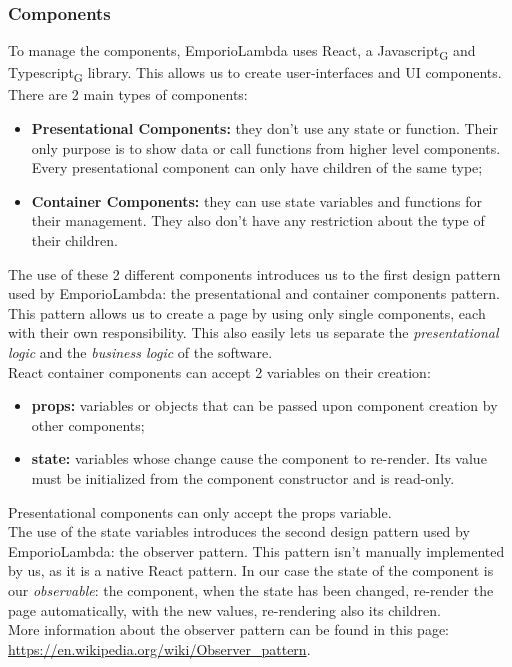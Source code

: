 \subsubsection{Components}
To manage the components, EmporioLambda uses React, a Javascript\textsubscript{G} and Typescript\textsubscript{G} library. This allows us to create user-interfaces and UI components.
There are 2 main types of components:
\begin{itemize}
\item \textbf{Presentational Components:} they don't use any state or function. Their only purpose is to show data or call functions from higher level components. Every presentational component can only have children of the same type;
\item \textbf{Container Components:} they can use state variables and functions for their management. They also don't have any restriction about the type of their children.
\end{itemize}
The use of these 2 different components introduces us to the first design pattern used by EmporioLambda: the presentational and container components pattern. This pattern allows us to create a page by using only single components, each with their own responsibility. This also easily lets us separate the \textit{presentational logic} and the \textit{business logic} of the software.\\
React container components can accept 2 variables on their creation:
\begin{itemize}
\item \textbf{props:} variables or objects that can be passed upon component creation by other components;
\item \textbf{state:} variables whose change cause the component to re-render. Its value must be initialized from the component constructor and is read-only.
\end{itemize}
Presentational components can only accept the props variable.\\
The use of the state variables introduces the second design pattern used by EmporioLambda: the observer pattern. This pattern isn't manually implemented by us, as it is a native React pattern. In our case the state of the component is our \textit{observable}: the component, when the state has been changed, re-render the page automatically, with the new values, re-rendering also its children.\\More information about the observer pattern can be found in this page:\\
\url{https://en.wikipedia.org/wiki/Observer_pattern}.\\

